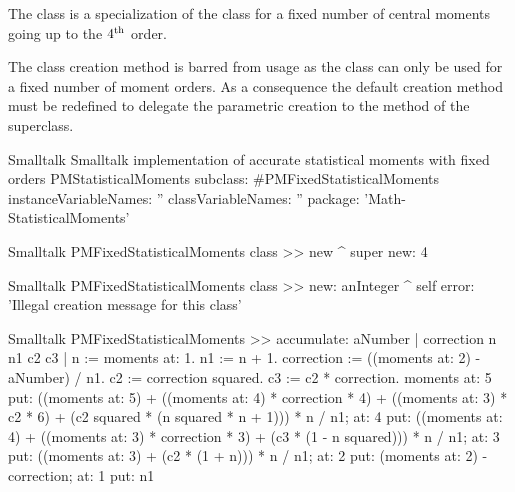 The class  is a specialization of the class  for a fixed number of central moments going up to the $4^{\mathop{\textrm{th}}}$ order.

The class creation method  is barred from usage as the class can only be used for a fixed number of moment orders.
As a consequence the default creation method must be redefined to delegate the parametric creation to the method of the superclass.

\begin{listing}[label=lst:fixedmoments]{Smalltalk}
{Smalltalk implementation of accurate statistical moments with fixed orders}
PMStatisticalMoments subclass: #PMFixedStatisticalMoments
   instanceVariableNames: ''
   classVariableNames: ''
   package: 'Math-StatisticalMoments'
\end{listing}

\begin{displaycode}{Smalltalk}
PMFixedStatisticalMoments class >> new
    ^ super new: 4
\end{displaycode}

\begin{displaycode}{Smalltalk}
PMFixedStatisticalMoments class >> new: anInteger
    ^ self error: 'Illegal creation message for this class'
\end{displaycode}

\begin{displaycode}{Smalltalk}
PMFixedStatisticalMoments >> accumulate: aNumber
    | correction n n1 c2 c3 |
    n := moments at: 1.
    n1 := n + 1.
    correction := ((moments at: 2) - aNumber) / n1.
    c2 := correction squared.
    c3 := c2 * correction.
    moments
        at: 5
            put: ((moments at: 5) + ((moments at: 4) * correction * 
                                                                   4) 
                    + ((moments at: 3) * c2 * 6) + (c2 squared * (n 
                                                   squared * n + 1))) 
                    * n / n1;
        at: 4
            put: ((moments at: 4) + ((moments at: 3) * correction * 
                                                                   3) 
                    + (c3 * (1 - n squared))) * n 
                    / n1;
        at: 3 put: ((moments at: 3) + (c2 * (1 + n))) * n / n1;
        at: 2 put: (moments at: 2) - correction;
        at: 1 put: n1
\end{displaycode}

